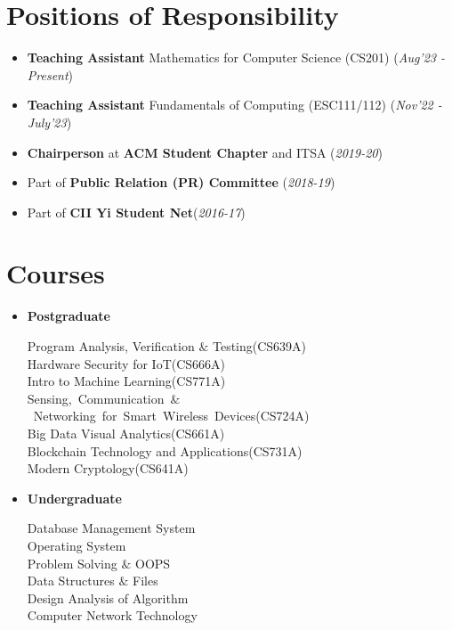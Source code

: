 \documentclass[10.8pt, a4paper]{extarticle}
\newcommand{\shorterSection}[1]{\vspace{-10pt}\section{#1}}
\begin{document}
\shorterSection{Positions of Responsibility}
\vspace{-2pt}
\begin{itemize}
    \item \textbf{Teaching Assistant} Mathematics for Computer Science (CS201) \hfill\hfill(\textit{Aug'23 - Present})
    \item \textbf{Teaching Assistant} Fundamentals of Computing (ESC111/112) \hfill\hfill(\textit{Nov'22 - July'23})
    \item \textbf{Chairperson} at \textbf{ACM Student Chapter} and ITSA \hfill\hfill(\textit{2019-20})
    \item Part of \textbf{Public Relation (PR) Committee} \hfill\hfill(\textit{2018-19})
    \item Part of \textbf{CII Yi Student Net}\hfill\hfill(\textit{2016-17})
\end{itemize}
\medskip



\shorterSection{Courses}
\vspace{-2pt}
\begin{itemize}
  \item \textbf{Postgraduate}
  \vspace{-10pt}
  \begin{multicols}{2}[\setlength{\columnsep}{105pt}]
    Program Analysis, Verification $\&$ Testing(CS639A)\\
    Hardware Security for IoT(CS666A)\\
    Intro to Machine Learning(CS771A)\\
    \mbox{Sensing, Communication $\&$ Networking for Smart Wireless Devices(CS724A)}\\
      Big Data Visual Analytics(CS661A)\\
      Blockchain Technology and Applications(CS731A)\\
      Modern Cryptology(CS641A)\\
  \end{multicols}
  \item \textbf{Undergraduate}
  \vspace{-12pt}
  \begin{multicols}{2}[\setlength{\columnsep}{105pt}]
      Database Management System\\
      Operating System\\
      Problem Solving $\&$ OOPS\\
      Data Structures $\&$ Files\\
      Design Analysis of Algorithm\\
      Computer Network Technology\\
  \end{multicols}
\end{itemize}
\medskip
\end{document}
